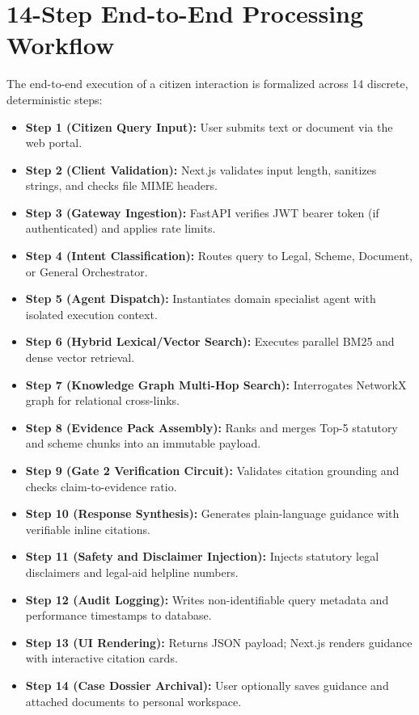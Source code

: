\section{14-Step End-to-End Processing Workflow}
\label{sec:14step_workflow}
The end-to-end execution of a citizen interaction is formalized across 14 discrete, deterministic steps:
\begin{itemize}
    \item \textbf{Step 1 (Citizen Query Input):} User submits text or document via the web portal.
    \item \textbf{Step 2 (Client Validation):} Next.js validates input length, sanitizes strings, and checks file MIME headers.
    \item \textbf{Step 3 (Gateway Ingestion):} FastAPI verifies JWT bearer token (if authenticated) and applies rate limits.
    \item \textbf{Step 4 (Intent Classification):} Routes query to Legal, Scheme, Document, or General Orchestrator.
    \item \textbf{Step 5 (Agent Dispatch):} Instantiates domain specialist agent with isolated execution context.
    \item \textbf{Step 6 (Hybrid Lexical/Vector Search):} Executes parallel BM25 and dense vector retrieval.
    \item \textbf{Step 7 (Knowledge Graph Multi-Hop Search):} Interrogates NetworkX graph for relational cross-links.
    \item \textbf{Step 8 (Evidence Pack Assembly):} Ranks and merges Top-5 statutory and scheme chunks into an immutable payload.
    \item \textbf{Step 9 (Gate 2 Verification Circuit):} Validates citation grounding and checks claim-to-evidence ratio.
    \item \textbf{Step 10 (Response Synthesis):} Generates plain-language guidance with verifiable inline citations.
    \item \textbf{Step 11 (Safety and Disclaimer Injection):} Injects statutory legal disclaimers and legal-aid helpline numbers.
    \item \textbf{Step 12 (Audit Logging):} Writes non-identifiable query metadata and performance timestamps to database.
    \item \textbf{Step 13 (UI Rendering):} Returns JSON payload; Next.js renders guidance with interactive citation cards.
    \item \textbf{Step 14 (Case Dossier Archival):} User optionally saves guidance and attached documents to personal workspace.
\end{itemize}

